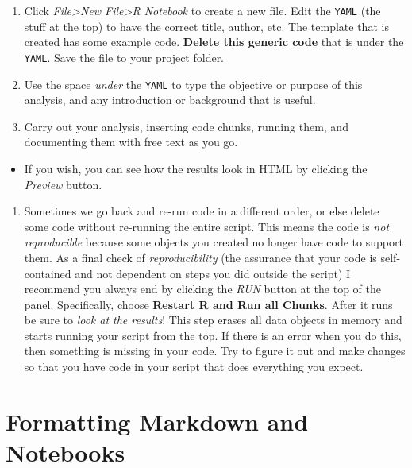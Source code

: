 \documentclass[
]{book}
\providecommand{\tightlist}{%
  \setlength{\itemsep}{0pt}\setlength{\parskip}{0pt}}
\begin{document}
\begin{enumerate}
\def\labelenumi{\arabic{enumi}.}
\tightlist
\item
  Click \emph{File\textgreater New File\textgreater R Notebook} to create a new file. Edit the \texttt{YAML} (the stuff at the top) to have the correct title, author, etc. The template that is created has some example code. \textbf{Delete this generic code} that is under the \texttt{YAML}. Save the file to your project folder.
\item
  Use the space \emph{under} the \texttt{YAML} to type the objective or purpose of this analysis, and any introduction or background that is useful.
\item
  Carry out your analysis, inserting code chunks, running them, and documenting them with free text as you go.\\
\end{enumerate}

\begin{itemize}
\tightlist
\item
  If you wish, you can see how the results look in HTML by clicking the \emph{Preview} button.
\end{itemize}

\begin{enumerate}
\def\labelenumi{\arabic{enumi}.}
\setcounter{enumi}{3}
\tightlist
\item
  Sometimes we go back and re-run code in a different order, or else delete some code without re-running the entire script. This means the code is \emph{not reproducible} because some objects you created no longer have code to support them. As a final check of \emph{reproducibility} (the assurance that your code is self-contained and not dependent on steps you did outside the script) I recommend you always end by clicking the \emph{RUN} button at the top of the panel. Specifically, choose \textbf{Restart R and Run all Chunks}. After it runs be sure to \emph{look at the results}! This step erases all data objects in memory and starts running your script from the top. If there is an error when you do this, then something is missing in your code. Try to figure it out and make changes so that you have code in your script that does everything you expect.
\end{enumerate}

\hypertarget{formatting-markdown-and-notebooks}{%
\chapter{Formatting Markdown and Notebooks}\label{formatting-markdown-and-notebooks}}
\end{document}
